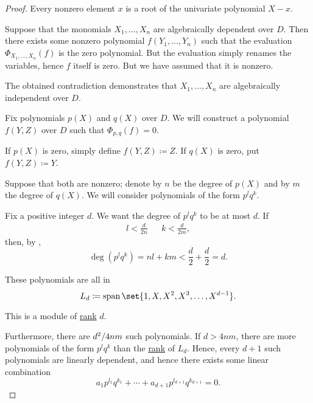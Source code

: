 \begin{proof}
   Every nonzero element \( x \) is a root of the univariate polynomial \( X - x \).

   Suppose that the monomials \( X_1, \ldots, X_n \) are algebraically dependent over \( D \). Then there exists some nonzero polynomial \( f(Y_1, \ldots, Y_n) \) such that the evaluation \( \Phi_{X_1, \dots, X_n}(f) \) is the zero polynomial. But the evaluation simply renames the variables, hence \( f \) itself is zero. But we have assumed that it is nonzero.

  The obtained contradiction demonstrates that \( X_1, \ldots, X_n \) are algebraically independent over \( D \).

   Fix polynomials \( p(X) \) and \( q(X) \) over \( D \). We will construct a polynomial \( f(Y, Z) \) over \( D \) such that \( \Phi_{p,q}(f) = 0 \).

  If \( p(X) \) is zero, simply define \( f(Y, Z) \coloneqq Z \). If \( q(X) \) is zero, put \( f(Y, Z) \coloneqq Y \).

  Suppose that both are nonzero; denote by \( n \) be the degree of \( p(X) \) and by \( m \) the degree of \( q(X) \). We will consider polynomials of the form \( p^l q^k \).

  Fix a positive integer \( d \). We want the degree of \( p^l q^k \) to be at most \( d \). If
  \begin{align*}
    l < \frac d {2n} && k < \frac d {2m},
  \end{align*}
  then, by ,
  \begin{equation*}
    \deg(p^l q^k) = nl + km < \frac d 2 + \frac d 2 = d.
  \end{equation*}

  These polynomials are all in
  \begin{equation*}
    L_d \coloneqq \linspan\set{ 1, X, X^2, X^3, \ldots, X^{d-1} }.
  \end{equation*}

  This is a module of \hyperref[thm:commutative_module_rank]{rank} \( d \).

  Furthermore, there are \( \ifrac {d^2} {4nm} \) such polynomials. If \( d > 4nm \), there are more polynomials of the form \( p^l q^k \) than the \hyperref[thm:commutative_module_rank]{rank} of \( L_d \). Hence, every \( d + 1 \) such polynomials are linearly dependent, and hence there exists some linear combination
  \begin{equation*}
    a_1 p^{l_1} q^{k_1} + \cdots + a_{d+1} p^{l_{d+1}} q^{k_{d+1}} = 0.
  \end{equation*}


\end{proof}
